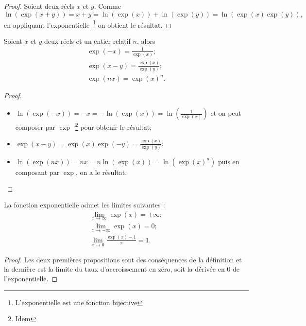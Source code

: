 \begin{proof}
  Soient deux réels $x$ et $y$. Comme
  \begin{equation}
    \ln(\exp(x+y))=x+y=\ln(\exp(x))+\ln(\exp(y))=\ln(\exp(x) \exp(y)),
  \end{equation}
  en appliquant l'exponentielle~\footnote{L'exponentielle est une fonction bijective} on obtient le résultat.
\end{proof}
%
\begin{prop}
  Soient $x$ et $y$ deux réels et un entier relatif $n$, alors
  \begin{gather}
    \exp(-x)=\frac{1}{\exp(x)}; \\
    \exp(x-y)=\frac{\exp(x)}{\exp(y)}; \\
    \exp(nx)=\exp(x)^n.
  \end{gather}
\end{prop}
\begin{proof}
  \begin{itemize}
  \item $\ln(\exp(-x))=-x=-\ln(\exp(x))=\ln \left(\frac{1}{\exp(x)}\right)$ et on peut composer par $\exp$~\footnote{Idem} pour obtenir le résultat;
  \item $\exp(x-y)=\exp(x) \exp(-y)=\frac{\exp(x)}{\exp(y)}$;
  \item $\ln(\exp(nx))=nx=n \ln(\exp(x))=\ln(\exp(x)^n)$ puis en composant par $\exp$, on a le résultat.
  \end{itemize}
\end{proof}
%
\begin{prop}
  La fonction exponentielle admet les limites suivantes~:
  \begin{gather}
    \lim\limits_{x \to \infty} \exp(x)=+\infty;\\
    \lim\limits_{x \to -\infty} \exp(x)=0;\\
    \lim\limits_{x \to 0} \frac{\exp(x)-1}{x}=1.
  \end{gather}
\end{prop}
\begin{proof}
  Les deux premières propositions sont des conséquences de la définition et la dernière est la limite du taux d'accroissement en zéro, soit la dérivée en 0 de l'exponentielle.
\end{proof}
%

